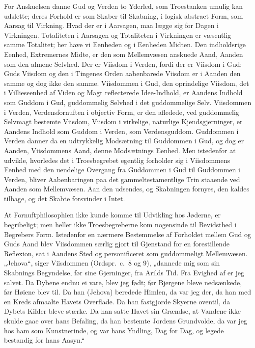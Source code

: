 \documentclass[12pt]{book}
\begin{document}
For Anskuelsen danne Gud og Verden to Yderled, som Troestanken
umulig kan udslette; deres Forhold er som Skaber til Skabning, i
logisk abstract Form, som Aarsag til Virkning. Hvad der er i
Aarsagen, maa lægge sig for Dagen i Virkningen. Totaliteten i
Aarsagen og Totaliteten i Virkningen er væsentlig samme Totalitet;
her have vi Eenheden og i Eenheden Midten. Den indholdsrige Eenhed,
Extremernes Midte, er den som Mellemvæsen anskuede Aand, Aanden som
den almene Selvhed. Der er Viisdom i Verden, fordi der er Viisdom i
Gud; Guds Viisdom og den i Tingenes Orden aabenbarede Viisdom er i
Aanden den samme og dog ikke den samme. Viisdommen i Gud, den
oprindelige Viisdom, det i Villieseenhed af Viden og Magt
reflecterede Idee-Indhold, er Aandens Indhold som Guddom i Gud,
guddommelig Selvhed i det guddommelige Selv. Viisdommen i Verden,
Verdensfornuften i objectiv Form, er den afledede, ved guddommelig
Selvmagt bestemte Viisdom, Viisdom i virkelige, naturlige
Kjendsgjerninger, er Aandens Indhold som Guddom i Verden, som
Verdensguddom. Guddommen i Verden danner da en udtrykkelig
Modsætning til Guddommen i Gud, og dog er Aanden, Viisdommens Aand,
denne Modsætnings Eenhed. Men istedenfor at udvikle, hvorledes det i
Troesbegrebet egentlig forholder sig i Viisdommens Eenhed med den
uendelige Overgang fra Guddommen i Gud til Guddommen i Verden,
bliver Aabenbaringen paa det gammeltestamentlige Trin staaende ved
Aanden som Mellemvæsen. Aan\-
den udsendes, og Skabningen fornyes, den kaldes tilbage, og det
Skabte forsvinder i Intet.

At Fornuftphilosophien ikke kunde komme til Udvikling hos Jøderne,
er begribeligt; men heller ikke Troesbegreberne kom nogensinde til
Bevidsthed i Begrebers Form. Istedenfor en nærmere Bestemmelse af
Forholdet mellem Gud og Guds Aand blev Viisdommen særlig gjort til
Gjenstand for en forestillende Reflexion, sat i Aandens Sted og
personificeret som guddommeligt Mellemvæsen. „Jehova“, siger
Viisdommen (Ordspr.\ c.\ 8 og 9), „dannede mig som sin Skabnings
Begyndelse, før sine Gjerninger, fra Arilds Tid. Fra Evighed af er
jeg salvet. Da Dybene endnu ei vare, blev jeg født; før Bjergene
bleve nedsænkede, før Høiene blev til. Da han (Jehova) beredede
Himlen, da var jeg der, da han med en Kreds afmaalte Havets
Overflade. Da han fastgjorde Skyerne oventil, da Dybets Kilder bleve
stærke. Da han satte Havet sin Grændse, at Vandene ikke skulde gaae
over hans Befaling, da han bestemte Jordens Grundvolde, da var jeg
hos ham som Kunstnerinde, og var hans Yndling, Dag for Dag, og
legede bestandig for hans Aasyn.“
\end{document}
